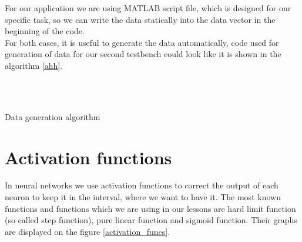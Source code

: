 \documentclass[a4paper,oneside,onecolumn,11pt]{report}
\begin{document}
		For our application we are using MATLAB script file, which is designed for our specific
		task, so we can write the data statically into the data vector in the beginning of the code. \\

		For both cases, it is useful to generate the data automatically, code used for generation
		of data for our second testbench could look like it is shown in the algorithm \ref{ahh}.\\

		\begin{algorithm}
			\SetAlgoLined
			\generate{}\\
				\
			\caption{Data generation algorithm}
			\label{ahh}
		\end{algorithm}

	\section{Activation functions}
	\label{act_funcs}
		In neural networks we use activation functions to correct the output of each neuron to keep
		it in the interval, where we want to have it. The most known functions and functions which we 
		are using in our lessons are hard limit function (so called step function), pure linear 
		function and sigmoid function. Their graphs are displayed on the figure \ref{activation_funcs}.\\
\end{document}
